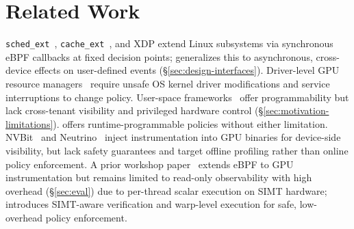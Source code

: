 \section{Related Work}
\label{sec:related}


\texttt{sched\_ext}~\cite{schedext-docs}, \texttt{cache\_ext}~\cite{zussman2025cache_ext}, and XDP extend Linux subsystems via synchronous eBPF callbacks at fixed decision points;
\sys generalizes this to asynchronous, cross-device effects on user-defined events (\S\ref{sec:design-interfaces}).
Driver-level GPU resource managers~\cite{kato2011timegraph,kato2012gdev,kernelintercept,han2022reef,fan2025gpreempt,wang2024gcaps} require unsafe OS kernel driver modifications and service interruptions to change policy.
User-space frameworks~\cite{ng2023paella,shen2025xsched,gim2025pie,chen2025ktransformers,coppock2025lithos,strati2024orion} offer programmability but lack cross-tenant visibility and privileged hardware control (\S\ref{sec:motivation-limitations}).
\sys offers runtime-programmable policies without either limitation.
NVBit~\cite{villa2019nvbit} and Neutrino~\cite{neutrino} inject instrumentation into GPU binaries for device-side visibility, but lack safety guarantees and target offline profiling rather than online policy enforcement.
A prior workshop paper~\cite{egpu} extends eBPF to GPU instrumentation but remains limited to read-only observability with high overhead (\S\ref{sec:eval}) due to per-thread scalar execution on SIMT hardware;
\sys introduces SIMT-aware verification and warp-level execution for safe, low-overhead policy enforcement.
